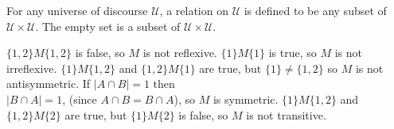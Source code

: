 \begin{Solution}{9.5}
 For any universe of discourse $\mathcal{U}$, a relation on $\mathcal{U}$  is defined to be any  subset of
$\mathcal{U}\times\mathcal{U}$. The empty set is a subset of $\mathcal{U}\times\mathcal{U}$.
\end{Solution}

\begin{Solution}{9.6}
$\{1,2\} M \{1,2\}$  is false, so $M$  is not reflexive.
$\{1\} M \{1\}$  is true, so $M$ is not irreflexive.
$\{1\} M \{1,2\}$  and  $\{1,2\} M \{1\}$
are true, but  $\{1\}\neq \{1,2\}$
so $M$ is not antisymmetric.
If $|A\cap B| =1$  then \\
 $|B\cap A |= 1$, (since $A\cap B = B \cap A$), so $M$ is symmetric.
$\{1\} M \{1,2\}$  and  $\{1,2\} M \{2\} $ are true,
but  $\{1\} M \{2\}$  is false,
so $M$ is not transitive.
\end{Solution}
